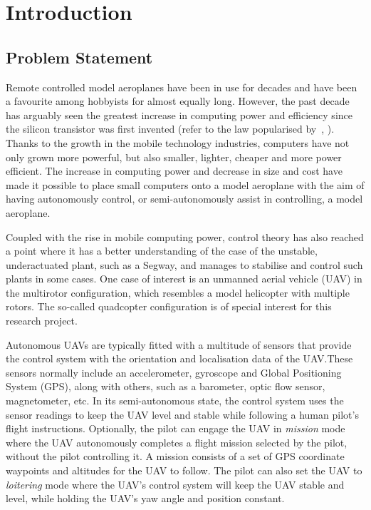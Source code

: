 \chapter{Introduction}
\label{chap1}

\section{Problem Statement}
\label{sec:problem-statement}

Remote controlled model aeroplanes have been in use for decades and have been a favourite among hobbyists for almost equally long. However, the past decade has arguably seen the greatest increase in computing power and efficiency since the silicon transistor was first invented (refer to the law popularised by~\citeauthor{moore2005cramming}, \citeyear{moore2005cramming}). Thanks to the growth in the mobile technology industries, computers have not only grown more powerful, but also smaller, lighter, cheaper and more power efficient. The increase in computing power and decrease in size and cost have made it possible to place small computers onto a model aeroplane with the aim of having autonomously control, or semi-autonomously assist in controlling, a model aeroplane. 

Coupled with the rise in mobile computing power, control theory has also reached a point where it has a better understanding of the case of the unstable, underactuated plant, such as a Segway, and manages to stabilise and control such plants in some cases. One case of interest is an unmanned aerial vehicle (UAV) in the multirotor configuration, which resembles a model helicopter with multiple rotors. The so-called quadcopter configuration is of special interest for this research project.  

Autonomous UAVs are typically fitted with a multitude of sensors that provide the control system with the orientation and localisation data of the UAV.\@ These sensors normally include an accelerometer, gyroscope and Global Positioning System (GPS), along with others, such as a barometer, optic flow sensor, magnetometer, etc. In its semi-autonomous state, the control system uses the sensor readings to keep the UAV level and stable while following a human pilot's flight instructions. Optionally, the pilot can engage the UAV in \emph{mission} mode where the UAV autonomously completes a flight mission selected by the pilot, without the pilot controlling it. A mission consists of a set of GPS coordinate waypoints and altitudes for the UAV to follow. The pilot can also set the UAV to \emph{loitering} mode where the UAV's control system will keep the UAV stable and level, while holding the UAV's yaw angle and position constant. 

